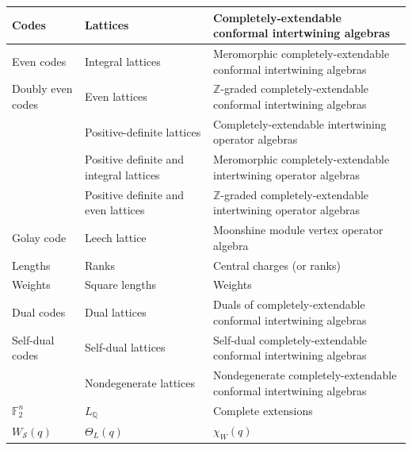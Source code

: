 \documentclass{amsproc}
\theoremstyle{definition}
\theoremstyle{remark}
\numberwithin{equation}{section}
\begin{document}
{\small \begin{table}
\begin{center}
\begin{tabular}{|p{.8in}|p{1.7in}|p{2.3in}|}\hline
Codes &Lattices &Completely-extendable conformal 
intertwining algebras \\\hline
Even codes&Integral lattices&Meromorphic completely-extendable
conformal intertwining algebras\\ \hline
Doubly even codes&Even lattices&$\mathbb{Z}$-graded completely-extendable
conformal intertwining algebras\\ \hline
&Positive-definite lattices&Completely-extendable intertwining operator 
algebras\\ \hline
&Positive definite and integral lattices&Meromorphic completely-extendable
intertwining operator algebras\\ \hline
&Positive definite and even lattices&$\mathbb{Z}$-graded 
completely-extendable 
intertwining operator algebras\\ \hline
Golay code&Leech lattice&Moonshine module
vertex operator algebra\\ \hline
Lengths&Ranks&Central charges (or ranks)\\\hline
Weights&Square lengths&Weights\\\hline
Dual codes&Dual lattices&Duals of completely-extendable 
conformal 
intertwining algebras\\\hline
Self-dual codes&Self-dual lattices &Self-dual completely-extendable 
conformal 
intertwining algebras\\\hline
&Nondegenerate lattices &Nondegenerate completely-extendable 
conformal 
intertwining algebras\\\hline
$\mathbb{F}_{2}^{n}$&$L_{\mathbb{Q}}$&Complete extensions\\\hline
$W_{\mathcal{S}}(q)$&$\Theta_{L}(q)$&$\chi_{W}(q)$\\\hline
\end{tabular}
\end{center}
\end{table}}
\end{document}
